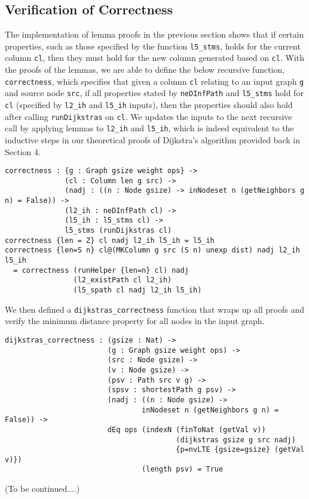 
\subsection{Verification of Correctness}
The implementation of lemma proofs in the previous section shows that if certain properties, such as those specified by the function \texttt{l5\_stms}, holds for the current column \texttt{cl}, then they must hold for the new column generated based on \texttt{cl}. With the proofs of the lemmas, we are able to define the below recursive function, \texttt{correctness}, which specifies that given a column \texttt{cl} relating to an input graph \texttt{g} and source node \texttt{src}, if all properties stated by \texttt{neDInfPath} and \texttt{l5\_stms} hold for \texttt{cl} (specified by \texttt{l2\_ih} and \texttt{l5\_ih} inputs), then the properties should also hold after calling \texttt{runDijkstras} on \texttt{cl}. We updates the inputs to the next recursive call by applying lemmas to \texttt{l2\_ih} and \texttt{l5\_ih}, which is indeed equivalent to the inductive steps in our theoretical proofs of Dijkstra's algorithm provided back in Section 4. 
\\
\begin{lstlisting}
correctness : {g : Graph gsize weight ops} ->
              (cl : Column len g src) ->
              (nadj : ((n : Node gsize) -> inNodeset n (getNeighbors g n) = False)) ->
              (l2_ih : neDInfPath cl) ->
              (l5_ih : l5_stms cl) ->
              l5_stms (runDijkstras cl)
correctness {len = Z} cl nadj l2_ih l5_ih = l5_ih
correctness {len=S n} cl@(MKColumn g src (S n) unexp dist) nadj l2_ih l5_ih
  = correctness (runHelper {len=n} cl) nadj 
  				(l2_existPath cl l2_ih) 
  				(l5_spath cl nadj l2_ih l5_ih)
\end{lstlisting}
We then defined a \texttt{dijkstras\_correctness} function that wraps up all proofs and verify the minimum distance property for all nodes in the input graph. 
\begin{lstlisting}
dijkstras_correctness : (gsize : Nat) ->
                        (g : Graph gsize weight ops) ->
                        (src : Node gsize) ->
                        (v : Node gsize) ->
                        (psv : Path src v g) ->
                        (spsv : shortestPath g psv) ->
                        (nadj : ((n : Node gsize) -> 
                        		inNodeset n (getNeighbors g n) = False)) ->
                        dEq ops (indexN (finToNat (getVal v)) 
                        				(dijkstras gsize g src nadj) 
                        				{p=nvLTE {gsize=gsize} (getVal v)}) 
                        		(length psv) = True
\end{lstlisting}

(To be continued....)